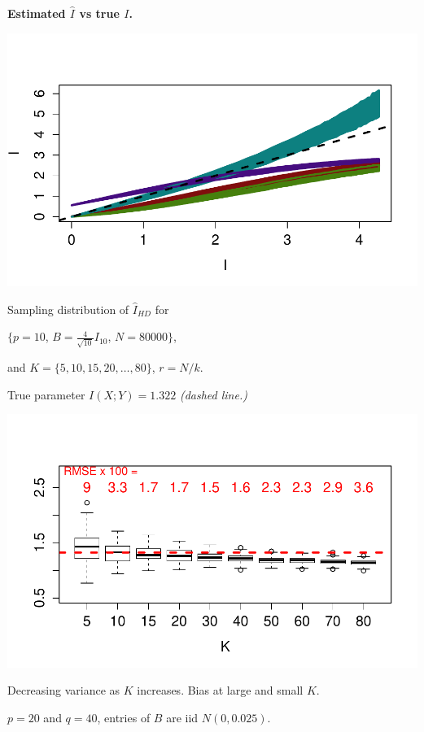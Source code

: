 \documentclass[12pt]{article}
\begin{document}
\begin{center}
\textbf{Estimated $\hat{I}$ vs true $I$.} 

\includegraphics[scale = 0.5, clip=true, trim=0.4in 0.5in 0 0.5in]{../info_theory_sims/fig4.pdf}
\end{center}

Sampling distribution of $\hat{I}_{HD}$ for \small{$\{p = 10$, $B = \frac{4}{\sqrt{10}} I_{10}$, $N = 80000\}$,

and $K = \{5, 10, 15, 20, \hdots, 80\}$, $r = N/k$.}

True parameter $I(X; Y) = 1.322$ \emph{(dashed line.)}
\begin{center}
\includegraphics[scale = 0.6, clip = true, trim = 0 0.5in 0 0.5in]{../info_theory_sims/fig5a.pdf}
\end{center}

Decreasing variance as $K$ increases. Bias at large and small $K$.

$p = 20$ and $q = 40$, entries of $B$ are iid $N(0, 0.025)$.
\end{document}
